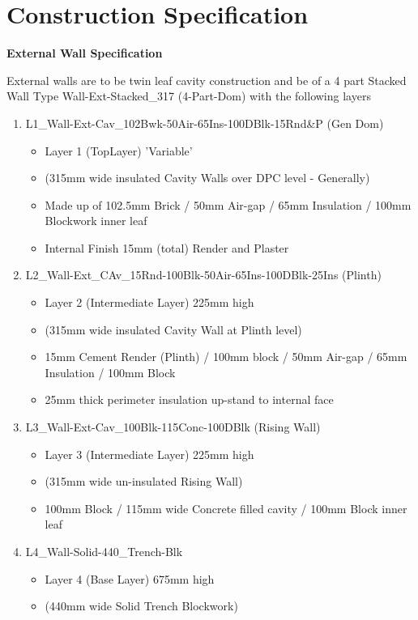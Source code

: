 \newpage

\section*{Construction Specification}


\textbf{External Wall Specification} 

External walls are to be twin leaf cavity construction and be of a 4 part Stacked Wall Type
Wall-Ext-Stacked\_317 (4-Part-Dom) with the following layers

\begin{enumerate}
	\item L1\_Wall-Ext-Cav\_102Bwk-50Air-65Ins-100DBlk-15Rnd\&P (Gen Dom)
	\begin{itemize}
		\item Layer 1 (TopLayer) 'Variable'
		\item (315mm wide insulated Cavity Walls over DPC level - Generally)
		\item Made up of 102.5mm Brick / 50mm Air-gap / 65mm Insulation / 100mm Blockwork inner leaf
		\item Internal Finish 15mm (total) Render and Plaster
	\end{itemize}
	
	\item L2\_Wall-Ext\_CAv\_15Rnd-100Blk-50Air-65Ins-100DBlk-25Ins (Plinth)
	\begin{itemize}
		\item Layer 2 (Intermediate Layer) 225mm high
		\item (315mm wide insulated Cavity Wall at Plinth level)
		\item 15mm Cement Render (Plinth) / 100mm block / 50mm Air-gap / 65mm Insulation / 100mm Block
		\item 25mm thick perimeter insulation up-stand to internal face
	\end{itemize}
	
	
	\item L3\_Wall-Ext-Cav\_100Blk-115Conc-100DBlk (Rising Wall)
	\begin{itemize}
		\item Layer 3 (Intermediate Layer) 225mm high
		\item (315mm wide un-insulated Rising Wall)
		\item 100mm Block / 115mm wide Concrete filled cavity / 100mm Block inner leaf
	\end{itemize}
	
	
	\item L4\_Wall-Solid-440\_Trench-Blk
	\begin{itemize}
		\item Layer 4 (Base Layer) 675mm high
		\item (440mm wide Solid Trench Blockwork)
	\end{itemize}
\end{enumerate}

